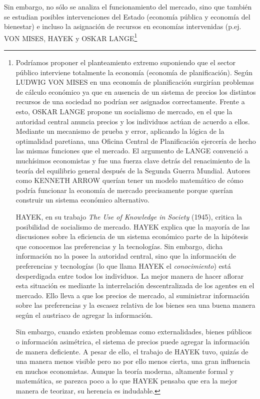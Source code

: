 \documentclass[10pt,a4paper]{article}
\begin{document}
Sin embargo, no sólo se analiza el funcionamiento del mercado, sino que también se estudian posibles intervenciones del Estado (economía pública y economía del bienestar) e incluso la asignación de recursos en economías intervenidas (p.ej. VON MISES, HAYEK y OSKAR LANGE\footnote{%
    Podríamos proponer el planteamiento extremo suponiendo que el sector público interviene totalmente la economía (economía de planificación). Según LUDWIG VON MISES en una economía de planificación surgirían problemas de cálculo económico ya que en ausencia de un sistema de precios los distintos recursos de una sociedad no podrían ser asignados correctamente.
Frente a esto, OSKAR LANGE propone un socialismo de mercado, en el que la autoridad central anuncia precios y los individuos actúan de acuerdo a ellos. Mediante un mecanismo de prueba y error, aplicando la lógica de la optimalidad paretiana, una Oficina Central de Planificación ejercería de hecho las mismas funciones que el mercado. El argumento de LANGE convenció a muchísimos economistas y fue una fuerza clave detrás del renacimiento de la teoría del equilibrio general después de la Segunda Guerra Mundial. Autores como KENNETH ARROW querían tener un modelo matemático de cómo podría funcionar la economía de mercado precisamente porque querían construir un sistema económico alternativo.

HAYEK, en su trabajo \textit{The Use of Knowledge in Society} (1945), critica la posibilidad de socialismo de mercado. HAYEK explica que la mayoría de las discusiones sobre la eficiencia de un sistema económico parte de la hipótesis que conocemos las preferencias y la tecnologías. Sin embargo, dicha información no la posee la autoridad central, sino que la información de preferencias y tecnologías (lo que llama HAYEK el \textit{conocimiento}) está desperdigada entre todos los individuos. La mejor manera de hacer aflorar esta situación es mediante la interrelación descentralizada de los agentes en el mercado. Ello lleva a que los precios de mercado, al suministrar información sobre las preferencias y la escasez relativa de los bienes sea una buena manera según el austriaco de agregar la información.

Sin embargo, cuando existen problemas como externalidades, bienes públicos o información asimétrica, el sistema de precios puede agregar la información de manera deficiente. A pesar de ello, el trabajo de HAYEK tuvo, quizás de una manera menos visible pero no por ello menos cierta, una gran influencia en muchos economistas. Aunque la teoría moderna, altamente formal y matemática, se parezca poco a lo que HAYEK pensaba que era la mejor manera de teorizar, su herencia es indudable.

}
\end{document}
